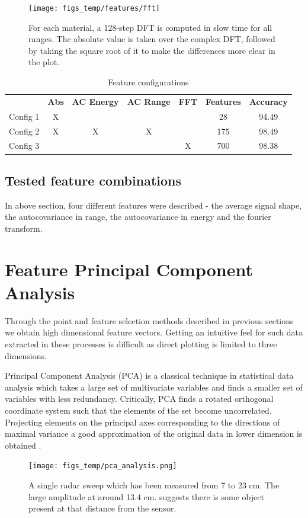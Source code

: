 \begin{figure}[h]
	\centering
	\texttt{[image: figs\_temp/features/fft]}
	\caption{For each material, a 128-step DFT is computed in slow time for all ranges. The absolute value is taken over the complex DFT, followed by taking the square root of it to make the differences more clear in the plot. }
	\label{fig:fft}
\end{figure}

\begin{table}
\begin{center}
  \begin{tabular}{|c|cccccc|}
\hline
    \rowcolor{gray!150}
		  & \color{white}\textbf{Abs} & \color{white}\textbf{AC Energy} & \color{white}\textbf{AC Range} & \color{white}\textbf{FFT} & \color{white}\textbf{Features} & \color{white}\textbf{Accuracy} \\
	  Config 1 & X &   &   &   & 28  & 94.49 \\
	  Config 2 & X & X & X & & 175 & 98.49 \\
	  Config 3 & & & & X & 700 & 98.38 \\
\hline
  \end{tabular}
\end{center}
\caption{Feature configurations}
\end{table}


\subsection{Tested feature combinations}

In above section, four different features were described - the average signal shape, the autocovariance in range, the autocovariance in energy and the fourier transform.


\section{Feature Principal Component Analysis}

Through the point and feature selection methods described in previous sections we obtain high dimensional feature vectors. Getting an intuitive feel for such data extracted in these processes is difficult as direct plotting is limited to three dimensions. 

Principal Component Analysis (PCA) is  a classical technique in statistical data analysis which takes a large set of multivariate variables and finds a smaller set of variables with less redundancy. Critically, PCA finds a rotated orthogonal coordinate system such that the elements of the set become uncorrelated. Projecting elements on the principal axes corresponding to the directions of maximal variance a good approximation of the original data in lower dimension is obtained \citep{hyvasrinen_karhunen_oja_2004}.

\begin{figure}[h]
	\centering
	\texttt{[image: figs\_temp/pca\_analysis.png]}
	\caption{A single radar sweep which has been measured from 7 to 23 cm. The large amplitude at around 13.4 cm. suggests there is some object present at that distance from the sensor.}
	\label{fig:pca}
\end{figure}

